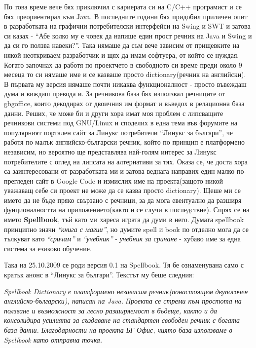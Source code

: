 По това време вече бях приключил с кариерата си на C/C++ програмист и
се бях преориентирал към Java. В последните години бях придобил
приличен опит в разработката на графични потребителски интерфейси на
Swing и SWT и затова си казах - "`Абе колко му е човек да напише един
прост речник на Java и Swing и да си го ползва навеки?"'. Така нямаше
да съм вече зависим от прищевките на някой неоткриваем разработчик и
щях да имам софтуера, от който се нуждая. Когато започнах да работя по
проектчето в свободното си време преди около 9 месеца то си нямаше име
и се казваше просто dictionary(речник на английски). В първата му
версия нямаше почти никаква функционалност - просто въвеждаш дума и
виждаш превода и. За речникова база бях използвал речниците от
gbgoffice, които декодирах от двоичния им формат и въведох в
релационна база данни. Реших, че може би и други хора имат моя проблем
с липсващите речникови системи под GNU/Linux и споделих в една тема
във форумите на популярният портален сайт за Линукс потребители
"`Линукс за българи"', че работя по малък английско-български речник,
който по принцип е платформено независим, но вероятно ще представлява
най-голям интерес за Линукс потребителите с оглед на липсата на
алтернативи за тях. Оказа се, че доста хора са заинтересовани от
разработката ми и затова веднага направих един малко по-прегледен сайт
в Google Code и измислих име на проекта(защото никой уважаващ себе си
проект не може да се казва просто dictionary). Щеше ми се името да не
бъде пряко свързано с речници, за да мога евентуално да разширя
фунционалността на приложението(както и се случи в последствие). Спрях
се на името \textbf{Spellbook}, тъй като ми хареса играта да думи в
него. Думата spellbook принципно значи \emph{"`книга с магии"'}, но думите
spell и book по отделно мога да се тълкуват като \emph{"`сричам"'} и
\emph{"`учебник"'} - \emph{учебник за сричане} - хубаво име за една система за
езиково обучение. 

Така на 25.10.2009 се роди версия 0.1 на Spellbook. Тя бе ознаменувана
само с кратък анонс в "`Линукс за българи"'. Текстът му беше следния:

\emph{Spellbook Dictionary е платформено независим речник(понастоящем
  двупосочен английско-български), написан на Java. Проекта се стреми
  към простота на ползване и възможност за лесно разширяемост в
  бъдеще, както и да консолидира усилията за създаване на стандартен
  свободен речник с богата база данни. 
Благодарности на проекта БГ Офис, чиято база използваме в Spellbook
като отправна точка.}

